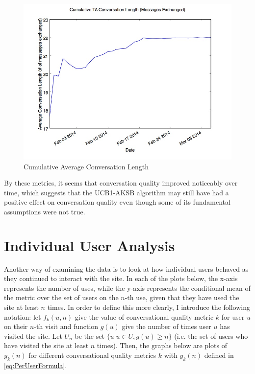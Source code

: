 \begin{figure}[H]
\centering
\includegraphics[trim= 0mm 0mm 0mm 0mm, clip, scale=0.5]{./Figures/CumulativeTAConversationLength(MessagesExchanged).jpg}
\caption{Cumulative Average Conversation Length}
\label{fig:TAMessagesExchangedCumulative}
\end{figure}

By these metrics, it seems that conversation quality improved noticeably over time, which suggests that the UCB1-AKSB algorithm may still have had a positive effect on conversation quality even though some of its fundamental assumptions were not true.

\section{Individual User Analysis}
\label{sec:IndividualUserAnalysis}

Another way of examining the data is to look at how individual users behaved as they continued to interact with the site. In each of the plots below, the x-axis represents the number of uses, while the y-axis represents the conditional mean of the metric over the set of users on the $n$-th use, given that they have used the site at least $n$ times. In order to define this more clearly, I introduce the following notation: let $f_k(u, n)$ give the value of conversational quality metric $k$ for user $u$ on their $n$-th visit and function $g(u)$ give the number of times user $u$ has visited the site. Let $U_n$ be the set $\{u | u \in {U}, g(u) \geq{n}\}$ (i.e. the set of users who have visited the site at least $n$ times). Then, the graphs below are plots of $y_k(n)$ for different conversational quality metrics $k$ with $y_k(n)$ defined in \autoref{eq:PerUserFormula}.

